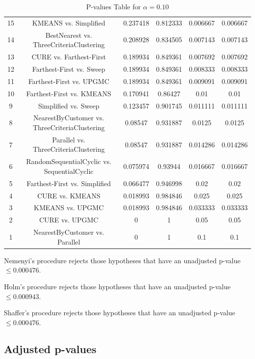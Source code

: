 \documentclass[a4paper,10pt]{article}
\begin{document}
\begin{landscape}
\begin{table}[!htp]
\begin{tabular}{cccccc}
15&KMEANS vs. Simplified&0.237418&0.812333&0.006667&0.006667\\
14&BestNearest vs. ThreeCriteriaClustering&0.208928&0.834505&0.007143&0.007143\\
13&CURE vs. Farthest-First&0.189934&0.849361&0.007692&0.007692\\
12&Farthest-First vs. Sweep&0.189934&0.849361&0.008333&0.008333\\
11&Farthest-First vs. UPGMC&0.189934&0.849361&0.009091&0.009091\\
10&Farthest-First vs. KMEANS&0.170941&0.86427&0.01&0.01\\
9&Simplified vs. Sweep&0.123457&0.901745&0.011111&0.011111\\
8&NearestByCustomer vs. ThreeCriteriaClustering&0.08547&0.931887&0.0125&0.0125\\
7&Parallel vs. ThreeCriteriaClustering&0.08547&0.931887&0.014286&0.014286\\
6&RandomSequentialCyclic vs. SequentialCyclic&0.075974&0.93944&0.016667&0.016667\\
5&Farthest-First vs. Simplified&0.066477&0.946998&0.02&0.02\\
4&CURE vs. KMEANS&0.018993&0.984846&0.025&0.025\\
3&KMEANS vs. UPGMC&0.018993&0.984846&0.033333&0.033333\\
2&CURE vs. UPGMC&0&1&0.05&0.05\\
1&NearestByCustomer vs. Parallel&0&1&0.1&0.1\\
\hline
\end{tabular}
\caption{P-values Table for $\alpha=0.10$}
\end{table}Nemenyi's procedure rejects those hypotheses that have an unadjusted p-value $\le0.000476$.

Holm's procedure rejects those hypotheses that have an unadjusted p-value $\le0.000943$.

Shaffer's procedure rejects those hypotheses that have an unadjusted p-value $\le0.000476$.

\pagebreak

\subsection{Adjusted p-values}


\end{landscape}
\end{document}
